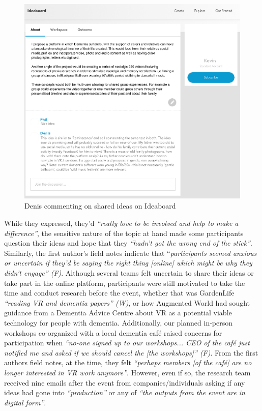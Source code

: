 \begin{figure}[htp]
\centering
\includegraphics[width=.8\linewidth]{Images/DemVR/Findings/IdeaboardDemVR.png}
\caption{Denis commenting on shared ideas on Ideaboard}
\label{fig:DenisIdeaboard}
\end{figure}

While they expressed, they’d \textit{“really love to be involved and help to make a difference”}, the sensitive nature of the topic at hand made some participants question their ideas and hope that they \textit{“hadn’t got the wrong end of the stick”}. Similarly, the first author’s field notes indicate that “\textit{participants seemed anxious or uncertain if they’d be saying the right thing [online] which might be why they didn’t engage” (F)}. Although several teams felt uncertain to share their ideas or take part in the online platform, participants were still motivated to take the time and conduct research before the event, whether that was GardenLife \textit{“reading VR and dementia papers” (W)}, or how Augmented World had sought guidance from a Dementia Advice Centre about VR as a potential viable technology for people with dementia. Additionally, our planned in-person workshops co-organized with a local dementia café raised concerns for participation when \textit{“no-one signed up to our workshops... CEO of the café just notified me and asked if we should cancel the [the workshops]” (F)}. From the first authors field notes, at the time, they felt \textit{“perhaps members [of the café] are no longer interested in VR work anymore”}. However, even if so, the research team received nine emails after the event from companies/individuals asking if any ideas had gone into \textit{“production”} or any of \textit{“the outputs from the event are in digital form”}. 

